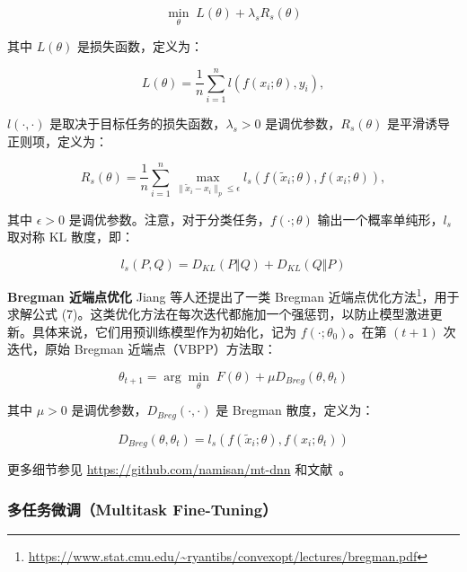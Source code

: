 \documentclass[11pt]{article}
\begin{document}
\begin{equation}
\min_{\theta} \; L(\theta) + \lambda_s R_s(\theta)
\end{equation}

其中 $L(\theta)$ 是损失函数，定义为：

\begin{equation}
L(\theta) = \frac{1}{n}\sum_{i=1}^{n} l(f(x_i; \theta), y_i),
\end{equation}

$l(\cdot, \cdot)$ 是取决于目标任务的损失函数，$\lambda_s > 0$ 是调优参数，$R_s(\theta)$ 是平滑诱导正则项，定义为：

\begin{equation}
R_s(\theta) = \frac{1}{n}\sum_{i=1}^{n} \max_{\lVert \tilde{x}_i - x_i \rVert_p \le \epsilon} l_s(f(\tilde{x}_i; \theta), f(x_i; \theta)),
\end{equation}

其中 $\epsilon > 0$ 是调优参数。注意，对于分类任务，$f(\cdot; \theta)$ 输出一个概率单纯形，$l_s$ 取对称 KL 散度，即：

\begin{equation}
l_s(P, Q) = D_{KL}(P \Vert Q) + D_{KL}(Q \Vert P)
\end{equation}

\textbf{Bregman 近端点优化} Jiang 等人还提出了一类 Bregman 近端点优化方法\footnote{\url{https://www.stat.cmu.edu/~ryantibs/convexopt/lectures/bregman.pdf}}，用于求解公式 (7)。这类优化方法在每次迭代都施加一个强惩罚，以防止模型激进更新。具体来说，它们用预训练模型作为初始化，记为 $f(\cdot; \theta_0)$。在第 $(t+1)$ 次迭代，原始 Bregman 近端点（VBPP）方法取：

\begin{equation}
\theta_{t+1} = \arg\min_{\theta} \; F(\theta) + \mu D_{Breg}(\theta, \theta_t)
\end{equation}

其中 $\mu > 0$ 是调优参数，$D_{Breg}(\cdot, \cdot)$ 是 Bregman 散度，定义为：

\begin{equation}
D_{Breg}(\theta, \theta_t) = l_s(f(\tilde{x}_i; \theta), f(x_i; \theta_t))
\end{equation}

更多细节参见 \url{https://github.com/namisan/mt-dnn} 和文献~\cite{jiang2019smart}。

\subsubsection{多任务微调（Multitask Fine-Tuning）}
\end{document}
